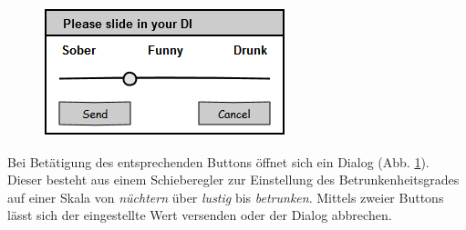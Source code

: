 \begin{figure}[H]
\centering
\includegraphics[width=0.45\linewidth]{Bilder/MockDiSlider}
\caption{}
\label{fig:MockDiSlider}
\end{figure}

Bei Betätigung des entsprechenden Buttons öffnet sich ein Dialog (Abb. \ref{fig:MockDiSlider}). Dieser besteht aus einem Schieberegler zur Einstellung des Betrunkenheitsgrades auf einer Skala von \textit{nüchtern} über \textit{lustig} bis \textit{betrunken}. Mittels zweier Buttons lässt sich der eingestellte Wert versenden oder der Dialog abbrechen.